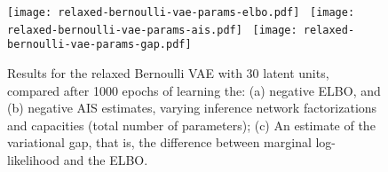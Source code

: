 \begin{figure}[t]
  \centering
  \subcaptionbox{}%
  {\texttt{[image: relaxed-bernoulli-vae-params-elbo.pdf]}}
  \,
  \subcaptionbox{}%
  {\texttt{[image: relaxed-bernoulli-vae-params-ais.pdf]}}
  \,
  \subcaptionbox{\label{fig:vae-gap}}%
  {\texttt{[image: relaxed-bernoulli-vae-params-gap.pdf]}}
  \caption[Results for relaxed Bernoulli VAEs]{Results for the relaxed Bernoulli VAE with 30 latent units, compared after 1000 epochs of learning the: (a) negative ELBO, and (b) negative AIS estimates, varying inference network factorizations and capacities (total number of parameters); (c) An estimate of the variational gap, that is, the difference between marginal log-likelihood and the ELBO.}
  \vspace*{-2ex}
  \label{fig:relaxed-bernoulli-vae}
\end{figure}

